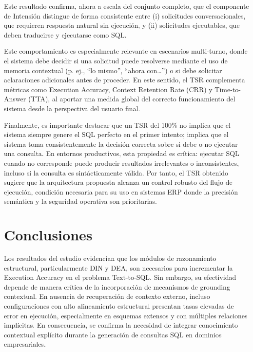 \documentclass[journal]{IEEEtran}
\begin{document}
Este resultado confirma, ahora a escala del conjunto completo, que el componente de Intensión distingue de forma consistente entre (i) solicitudes conversacionales, que requieren respuesta natural sin ejecución, y (ii) solicitudes ejecutables, que deben traducirse y ejecutarse como SQL.

Este comportamiento es especialmente relevante en escenarios multi-turno, donde el sistema debe decidir si una solicitud puede resolverse mediante el uso de memoria contextual (p. ej., ``lo mismo'', ``ahora con\ldots'') o si debe solicitar aclaraciones adicionales antes de proceder. En este sentido, el TSR complementa métricas como Execution Accuracy, Context Retention Rate (CRR) y Time-to-Answer (TTA), al aportar una medida global del correcto funcionamiento del sistema desde la perspectiva del usuario final.

Finalmente, es importante destacar que un TSR del 100\% no implica que el sistema siempre genere el SQL perfecto en el primer intento; implica que el sistema toma consistentemente la decisión correcta sobre si debe o no ejecutar una consulta. En entornos productivos, esta propiedad es crítica: ejecutar SQL cuando no corresponde puede producir resultados irrelevantes o inconsistentes, incluso si la consulta es sintácticamente válida. Por tanto, el TSR obtenido sugiere que la arquitectura propuesta alcanza un control robusto del flujo de ejecución, condición necesaria para su uso en sistemas ERP donde la precisión semántica y la seguridad operativa son prioritarias.

\section{Conclusiones}

Los resultados del estudio evidencian que los módulos de razonamiento estructural, particularmente DIN y DEA, son necesarios para incrementar la Execution Accuracy en el problema Text-to-SQL. Sin embargo, su efectividad depende de manera crítica de la incorporación de mecanismos de grounding contextual. En ausencia de recuperación de contexto externo, incluso configuraciones con alto alineamiento estructural presentan tasas elevadas de error en ejecución, especialmente en esquemas extensos y con múltiples relaciones implícitas. En consecuencia, se confirma la necesidad de integrar conocimiento contextual explícito durante la generación de consultas SQL en dominios empresariales.
\end{document}
